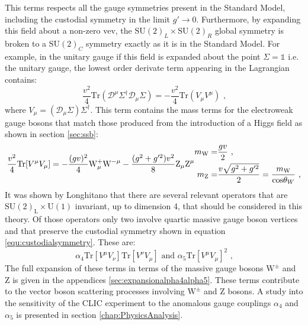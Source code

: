 %
\noindent This terms respects all the gauge symmetries present in the Standard Model, including the custodial symmetry in the limit $g' \rightarrow 0$.  Furthermore, by expanding this field about a non-zero vev, the $\text{SU}(2)_{L} \times \text{SU}(2)_{R}$ global symmetry is broken to a $\text{SU}(2)_{C}$ symmetry exactly as it is in the Standard Model.  For example, in the unitary gauge if this field is expanded about the point $\Sigma = \mathbb{1}$ i.e. the unitary gauge, the lowest order derivate term appearing in the Lagrangian contains:
%
\begin{equation}
\frac{v^{2}}{4} \text{Tr} (\mathcal{D}^{\mu} \Sigma^{\dagger} \mathcal{D}_{\mu} \Sigma) = -\frac{v^{2}}{4}\text{Tr}(V_{\mu} V^{\mu}) \text{ ,} 
\end{equation}
%
\noindent where $V_{\mu} = (\mathcal{D}_{\mu}\Sigma) \Sigma^{\dagger}$.  This term contains the mass terms for the electroweak gauge bosons that match those produced from the introduction of a Higgs field as shown in section \ref{sec:ssb}:
%
\begin{equation}
\frac{v^{2}}{4}\text{Tr}[V^{\mu}V_{\mu}] = - \frac{(gv)^{2}}{4} \text{W}^{+}_{\mu} \text{W}^{-\mu} - \frac{(g^{2} + g'^{2})v^{2}}{8} \text{Z}_{\mu} \text{Z}^{\mu} \\
\begin{aligned}
m_{\text{W}} = & \frac{gv}{2} \text{ ,} \\
m_{\text{Z}} = & \frac{v\sqrt{g^{2} + g'^{2}}}{2} = \frac{m_{\text{W}}}{\text{cos}{\theta_{W}}} \text{ ,}
\end{aligned}
\end{equation}
%
\noindent It was shown by Longhitano \cite{Longhitano:1980tm, Herrero:1994tj} that there are several relevant operators that are $\text{SU}(2)_{\text{L}} \times \text{U}(1)$ invariant, up to dimension 4, that should be considered in this theory.  Of those operators only two involve quartic massive gauge boson vertices and that preserve the custodial symmetry \cite{Belyaev:354051} shown in equation \ref{equ:custodialsymmetry}.  These are:
%
\begin{equation}
\alpha_{4}\text{Tr}[V^{\mu}V_{\nu}]\text{Tr}[V^{\nu}V_{\mu}] \text{ and } \alpha_{5}\text{Tr}[V^{\mu}V_{\mu}]^{2} \text{ ,}
\end{equation}
%
\noindent The full expansion of these terms in terms of the massive gauge bosons $\text{W}^{\pm}$ and Z is given in the appendices \ref{sec:expansionalpha4alpha5}.  These terms contribute to the vector boson scattering processes involving $\text{W}^{\pm}$ and Z bosons.  A study into the sensitivity of the CLIC experiment to the anomalous gauge couplings $\alpha_{4}$ and $\alpha_{5}$ is presented in section \ref{chap:PhysicsAnalysis}.

